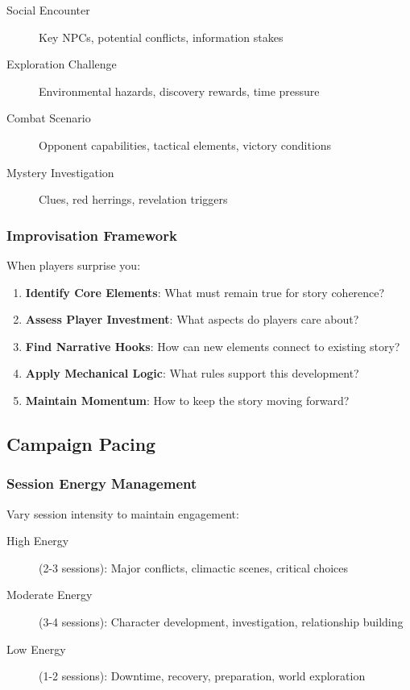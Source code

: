 \documentclass[11pt]{article}
\begin{document}
\begin{description}
  \item[Social Encounter] Key NPCs, potential conflicts, information stakes
  \item[Exploration Challenge] Environmental hazards, discovery rewards, time pressure
  \item[Combat Scenario] Opponent capabilities, tactical elements, victory conditions
  \item[Mystery Investigation] Clues, red herrings, revelation triggers
\end{description}

\subsubsection{Improvisation Framework}

When players surprise you:

\begin{enumerate}
  \item \textbf{Identify Core Elements}: What must remain true for story coherence?
  \item \textbf{Assess Player Investment}: What aspects do players care about?
  \item \textbf{Find Narrative Hooks}: How can new elements connect to existing story?
  \item \textbf{Apply Mechanical Logic}: What rules support this development?
  \item \textbf{Maintain Momentum}: How to keep the story moving forward?
\end{enumerate}

\subsection{Campaign Pacing}

\subsubsection{Session Energy Management}

Vary session intensity to maintain engagement:

\begin{description}
  \item[High Energy] (2-3 sessions): Major conflicts, climactic scenes, critical choices
  \item[Moderate Energy] (3-4 sessions): Character development, investigation, relationship building
  \item[Low Energy] (1-2 sessions): Downtime, recovery, preparation, world exploration
\end{description}
\end{document}
